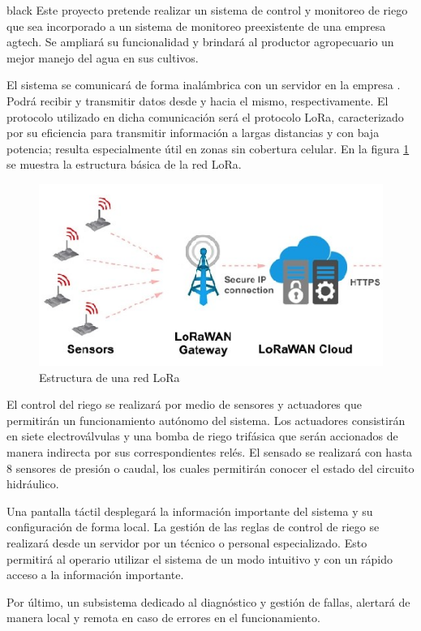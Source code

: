 \documentclass[11pt]{charter}
\begin{document}
\begin{consigna}{black}
Este proyecto pretende realizar un sistema de control y monitoreo de riego que sea incorporado a un sistema de monitoreo preexistente de una empresa agtech. Se ampliará su funcionalidad y brindará al productor agropecuario un mejor manejo del agua en sus cultivos. 

El sistema se comunicará de forma inalámbrica con un servidor en la empresa \empclientename . Podrá recibir  y transmitir datos desde y hacia el mismo, respectivamente. El protocolo utilizado en dicha comunicación será el protocolo LoRa, caracterizado por su eficiencia para transmitir información a largas distancias y con baja potencia; resulta especialmente útil en zonas sin cobertura celular. En la figura \ref{fig:redLoRa} se muestra la estructura básica de la red LoRa.

\begin{figure}[htpb]
\centering 
\includegraphics[width=.7\textwidth]{./Figuras/redLora.png}
\caption{Estructura de una red LoRa}
\label{fig:redLoRa}
\end{figure}

El control del riego se realizará por medio de sensores y actuadores que permitirán un funcionamiento autónomo del sistema. Los actuadores consistirán en siete electroválvulas y una bomba de riego trifásica que serán accionados de manera indirecta por sus correspondientes relés. El sensado se realizará con hasta 8 sensores de presión o caudal, los cuales permitirán conocer el estado del circuito hidráulico.

Una pantalla táctil desplegará la información importante del sistema y su configuración de forma local. La gestión de las reglas de control de riego se realizará desde un servidor por un técnico o personal especializado. Esto permitirá al operario utilizar el sistema de un modo intuitivo y con un rápido acceso a la información importante.

Por último, un subsistema dedicado al diagnóstico y gestión de fallas, alertará de manera local y remota en caso de errores en el funcionamiento.


\end{consigna}
\end{document}
